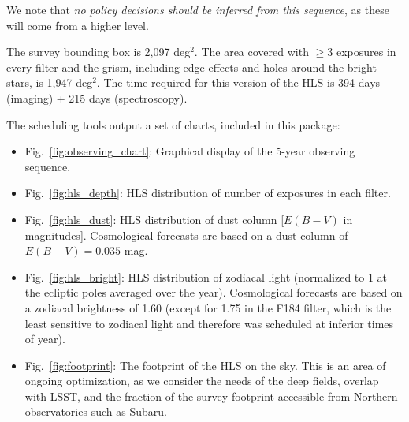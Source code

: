 We note that \emph{no policy decisions should be inferred from this sequence},
as these will come from a higher level.

The survey bounding box is 2,097 deg$^2$. The area covered with $\ge 3$ exposures
in every filter and the grism, including edge effects and holes around the
bright stars, is 1,947 deg$^2$. The time required for this version of the HLS is
394 days (imaging) + 215 days (spectroscopy).

The scheduling tools output a set of charts, included in this package:
\begin{itemize}
\item
Fig.~\ref{fig:observing_chart}: Graphical display of the 5-year observing sequence.
\item
Fig.~\ref{fig:hls_depth}: HLS distribution of number of exposures in each filter.
\item
Fig.~\ref{fig:hls_dust}: HLS distribution of dust column [$E(B-V)$ in magnitudes]. Cosmological forecasts are based on a dust column of $E(B-V)=0.035$ mag.
\item
Fig.~\ref{fig:hls_bright}: HLS distribution of zodiacal light (normalized to 1 at the ecliptic poles averaged over the year). Cosmological forecasts are based on a zodiacal brightness of 1.60 (except for 1.75 in the F184 filter, which is the least sensitive to zodiacal light and therefore was scheduled at inferior times of year).
\item
Fig.~\ref{fig:footprint}: The footprint of the HLS on the sky. This is an area of ongoing optimization, as we consider the needs of the deep fields, overlap with LSST, and the fraction of the survey footprint accessible from Northern observatories such as Subaru.
\end{itemize}

